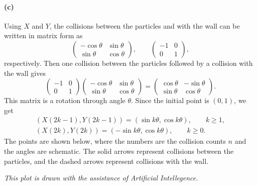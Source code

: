 \documentclass{article}
\begin{document}
\begin{solution}
	\paragraph{(c)} Using $X$ and $Y$, the collisions between the particles and with the wall can be written in matrix form as
	\[
		\begin{pmatrix} -\cos\theta & \sin\theta \\ \sin\theta & \cos\theta \end{pmatrix},
		\qquad
		\begin{pmatrix} -1 & 0 \\ 0 & 1 \end{pmatrix},
	\]
	respectively. Then one collision between the particles followed by a collision with the wall gives
	\[
		\begin{pmatrix} -1 & 0 \\ 0 & 1 \end{pmatrix}
		\begin{pmatrix} -\cos\theta & \sin\theta \\ \sin\theta & \cos\theta \end{pmatrix}
		= \begin{pmatrix} \cos\theta & -\sin\theta \\ \sin\theta & \cos\theta \end{pmatrix}.
	\]
	This matrix is a rotation through angle $\theta$. Since the initial point is $(0,1)$, we get
	\begin{gather*}
		(X(2k-1),Y(2k-1)) = (\sin k\theta,\cos k\theta), \qquad k\geq 1, \\
		(X(2k),Y(2k)) = (-\sin k\theta,\cos k\theta), \qquad k\geq 0.
	\end{gather*}
	The points are shown below, where the numbers are the collision counts $n$ and the angles are schematic. The solid arrows represent collisions between the particles, and the dashed arrows represent collisions with the wall.
	\begin{center}
		
	\end{center}
	{\small \textit{This plot is drawn with the assistance of Artificial Intellegence.}}


\end{solution}
\end{document}

